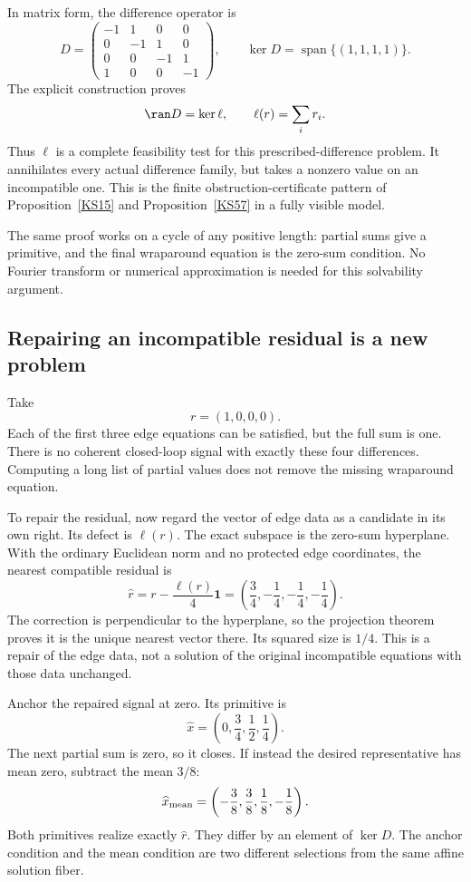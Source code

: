 In matrix form, the difference operator is
\[
 D=\begin{pmatrix}
 -1&1&0&0\\
 0&-1&1&0\\
 0&0&-1&1\\
 1&0&0&-1
 \end{pmatrix},\qquad
 \ker D=\operatorname{span}\{(1,1,1,1)\}.
\]
The explicit construction proves
\[
 \ran D=\ker\ell,\qquad \ell(r)=\sum_i r_i.
\]
Thus \(\ell\) is a complete feasibility test for this prescribed-difference problem. It annihilates every actual difference family, but takes a nonzero value on an incompatible one. This is the finite obstruction-certificate pattern of Proposition~\ref{KS15} and Proposition~\ref{KS57} in a fully visible model.

The same proof works on a cycle of any positive length: partial sums give a primitive, and the final wraparound equation is the zero-sum condition. No Fourier transform or numerical approximation is needed for this solvability argument.

\subsection{Repairing an incompatible residual is a new problem}
Take
\[
 r=(1,0,0,0).
\]
Each of the first three edge equations can be satisfied, but the full sum is one. There is no coherent closed-loop signal with exactly these four differences. Computing a long list of partial values does not remove the missing wraparound equation.

To repair the residual, now regard the vector of edge data as a candidate in its own right. Its defect is \(\ell(r)\). The exact subspace is the zero-sum hyperplane. With the ordinary Euclidean norm and no protected edge coordinates, the nearest compatible residual is
\[
 \widehat r=r-\frac{\ell(r)}4\mathbf1
 =\left(\frac34,-\frac14,-\frac14,-\frac14\right).
\]
The correction is perpendicular to the hyperplane, so the projection theorem proves it is the unique nearest vector there. Its squared size is \(1/4\). This is a repair of the edge data, not a solution of the original incompatible equations with those data unchanged.

Anchor the repaired signal at zero. Its primitive is
\begin{equation}\label{eq:cycle-anchor-primitive}
 \widehat x=\left(0,\frac34,\frac12,\frac14\right).
\end{equation}
The next partial sum is zero, so it closes. If instead the desired representative has mean zero, subtract the mean \(3/8\):
\[
 \widehat x_{\rm mean}
 =\left(-\frac38,\frac38,\frac18,-\frac18\right).
\]
Both primitives realize exactly \(\widehat r\). They differ by an element of \(\ker D\). The anchor condition and the mean condition are two different selections from the same affine solution fiber.


